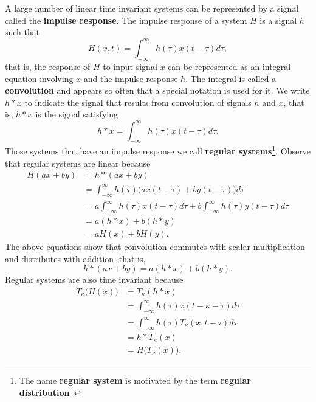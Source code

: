 \documentclass[11pt,a4paper]{book}
\theoremstyle{plain}
\numberwithin{equation}{section}
\newcommand{\term}{\textbf}
\begin{document}
A large number of linear time invariant systems can be represented by a signal called the \term{impulse response}.  The impulse response of a system $H$ is a signal $h$ such that
\[
H(x,t) = \int_{-\infty}^{\infty} h(\tau) x(t - \tau) d\tau,
\]
that is, the response of $H$ to input signal $x$ can be represented as an integral equation involving $x$ and the impulse response $h$.  The integral is called a \term{convolution} and appears so often that a special notation is used for it.  We write $h * x$ to  indicate the signal that results from convolution of signals $h$ and $x$, that is, $h * x$ is the signal satisfying
\[
h * x = \int_{-\infty}^{\infty} h(\tau) x(t - \tau) d\tau.
\]
Those systems that have an impulse response we call \term{regular systems}\footnote{The name \term{regular system} is motivated by the term \term{regular distribution}~\citep{Zemanian_dist_theory_1965}}.  Observe that regular systems are linear because
\begin{equation}\begin{split}\label{eq:regsystemislinear}
H(ax + by) &= h * (ax + by) \\
&= \int_{-\infty}^{\infty} h(\tau) \big(ax(t - \tau) + by(t - \tau)\big) d\tau \\
&= a\int_{-\infty}^{\infty} h(\tau) x(t - \tau) d\tau + b\int_{-\infty}^{\infty} h(\tau)y(t - \tau) d\tau \\
&= a (h * x) + b(h*y) \\
&= a H(x) + bH(y).
\end{split}\end{equation}
The above equations show that convolution commutes with scalar multiplication and distributes with addition, that is,
\[
h * (ax + by) =  a (h * x) + b(h*y).
\]
Regular systems are also time invariant because
\begin{align*}
T_\kappa\big(H(x)\big) &= T_\kappa(h * x ) \\
&= \int_{-\infty}^{\infty} h(\tau) x(t- \kappa - \tau) d\tau \\
&= \int_{-\infty}^{\infty} h(\tau) T_\kappa(x, t - \tau) d\tau \\ 
&= h * T_\kappa(x) \\
&= H\big(T_\kappa(x)\big). 
\end{align*}
\end{document}
